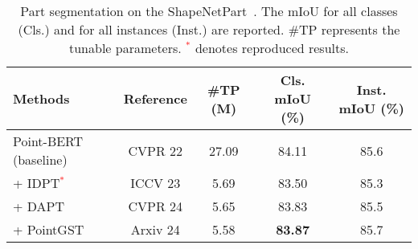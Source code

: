 \begin{table}
  \centering
  \scriptsize
  \setlength{\tabcolsep}{0.8mm}
  \caption{Part segmentation on the ShapeNetPart~\cite{yi2016scalable}. The mIoU for all classes (Cls.) and for all instances (Inst.) are reported. \#TP represents the tunable parameters. \textcolor{red}{$^*$} denotes reproduced results.}
    \begin{tabular}{lcccc}
    \toprule
    Methods & Reference & \#TP (M)& Cls. mIoU (\%) & Inst. mIoU (\%) \\
    \midrule
    Point-BERT~\cite{yu2022point} (baseline) &  CVPR 22 & 27.09 & 84.11 & 85.6 \\ 
    + IDPT\textcolor{red}{$^*$}~\cite{zha2023instance} & ICCV 23 & 5.69  & 83.50  & 85.3  \\
    + DAPT~\cite{zhou2024dynamic} & CVPR 24 & 5.65  & 83.83 & 85.5 \\
    + PointGST~\cite{liang2024parameter} & Arxiv 24 & 5.58  & \textbf{83.87} & 85.7 \\

\end{tabular}
\end{table}
